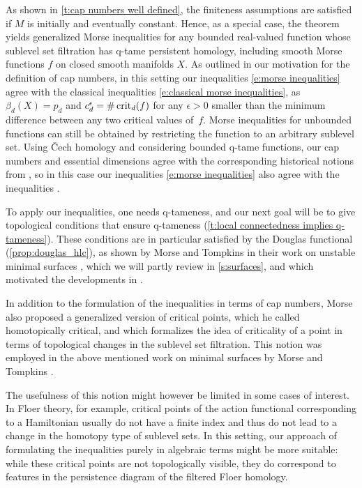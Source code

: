 As shown in \cref{t:cap numbers well defined}, the finiteness assumptions are satisfied if $M$ is initially and eventually constant.
Hence, as a special case, the theorem yields generalized Morse inequalities for any bounded real-valued function whose sublevel set filtration has q-tame persistent homology, including smooth Morse functions $f$ on closed smooth manifolds $X$.
As outlined in our motivation for the definition of cap numbers, in this setting our inequalities \eqref{e:morse inequalities} agree with the classical inequalities \eqref{e:classical morse inequalities}, as $\beta_d(X) = p_d$ and $c_d^{\epsilon} = \# \operatorname{crit}_d(f)$ for any $\epsilon > 0$ smaller than the minimum difference between any two critical values of~$f$.
Morse inequalities for unbounded functions can still be obtained by restricting the function to an arbitrary sublevel set.
Using \v{C}ech homology and considering bounded q-tame functions, our cap numbers and essential dimensions agree with the corresponding historical notions from \cite{Morse.1940}, so in this case our inequalities \eqref{e:morse inequalities} also agree with the inequalities \cite[Corollary~12.3]{Morse.1940}.

To apply our inequalities, one needs q-tameness, and our next goal will be to give topological conditions that ensure q-tameness (\cref{t:local connectedness implies q-tameness}).
These conditions are in particular satisfied by the Douglas functional (\cref{prop:douglas_hlc}), as shown by Morse and Tompkins in their work on unstable minimal surfaces \cite{Morse.1939}, which we will partly review in \cref{s:surfaces}, and which motivated the developments in \cite{Morse.1940}.

\begin{rem} \label{r:homotopically critial points}
	In addition to the formulation of the inequalities in terms of cap numbers, Morse also proposed a generalized version of critical points, which he called homotopically critical, and which formalizes the idea of criticality of a point in terms of topological changes in the sublevel set filtration.
	This notion was employed in the above mentioned work on minimal surfaces by Morse and Tompkins \cite{Morse.1939}.

	The usefulness of this notion might however be limited in some cases of interest.
	In Floer theory, for example, critical points of the action functional corresponding to a Hamiltonian usually do not have a finite index and thus do not lead to a change in the homotopy type of sublevel sets.
	In this setting, our approach of formulating the inequalities purely in algebraic terms might be more suitable: while these critical points are not topologically visible, they do correspond to features in the persistence diagram of the filtered Floer homology.
\end{rem}
